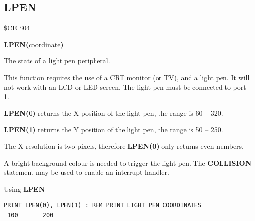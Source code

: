 \subsection{LPEN}
\begin{description}[leftmargin=2cm,style=nextline]
\item [Token:]    \$CE \$04

\item [Format:]   {\bf LPEN(}coordinate{\bf)}

\item [Returns:]  The state of a light pen peripheral.

                  This function requires the use of a CRT monitor (or TV), and a light pen. It will not work with an LCD or LED screen. The light pen must be connected to port 1.

                  {\bf LPEN(0)} returns the X position of the light pen, the range is 60 -- 320.

                  {\bf LPEN(1)} returns the Y position of the light pen, the range is 50 -- 250.

\item [Remarks:]  The X resolution is two pixels, therefore {\bf LPEN(0)} only returns even numbers.

                  A bright background colour is needed to trigger the light pen. The {\bf COLLISION} statement may be used to enable an interrupt handler.

\item [Example:]  Using {\bf LPEN}

\begin{tcolorbox}[colback=black,coltext=white]
\verbatimfont{\codefont}
\begin{verbatim}
PRINT LPEN(0), LPEN(1) : REM PRINT LIGHT PEN COORDINATES
 100       200
\end{verbatim}
\end{tcolorbox}
\end{description}


\newpage

